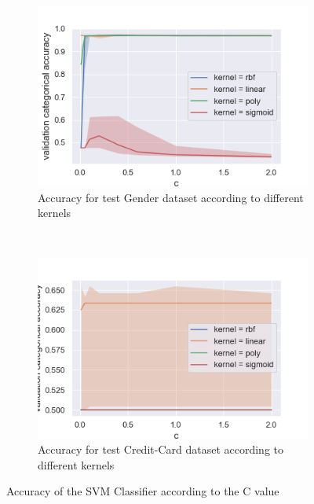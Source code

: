 \documentclass[10pt]{article}
\begin{document}
		\paragraph*{}
			\begin{figure}[h]
				\centering
				\begin{subfigure}[]{0.45\columnwidth}
					\centering
					\includegraphics[width=\linewidth]{../graphics/svm_gender_c_score_type_kernel.png}
					\caption{Accuracy for test Gender dataset according to different kernels}
					\label{svm:g_c}
				\end{subfigure}
				~
				\begin{subfigure}[]{0.45\columnwidth}
					\centering
					\includegraphics[width=\linewidth]{../graphics/svm_creditcard_c_score_type_kernel.png}
					\caption{Accuracy for test Credit-Card dataset according to different kernels}
					\label{svm:cc_c}
				\end{subfigure}
				\caption{Accuracy of the SVM Classifier according to the C value}
				\label{svm:c}
			\end{figure}
\end{document}
